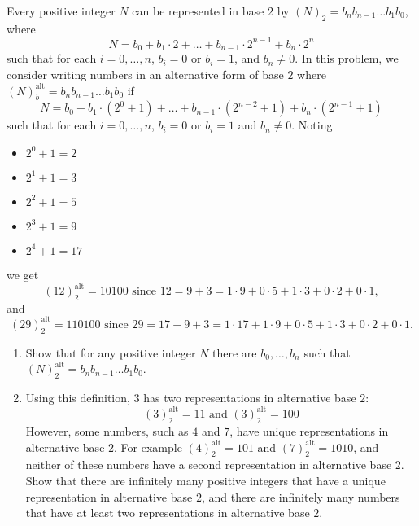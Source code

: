 Every positive integer $N$ can be represented in base $2$ by 
$(N)_{2} = b_{n}b_{n-1}\ldots b_{1}b_{0}$, where 
$$N = b_{0} + b_{1} \cdot 2 + \ldots + b_{n-1}  \cdot 2^{n-1} + b_{n}  \cdot 2^{n}$$
such that for each $i=0,\ldots,n$, $b_{i}=0$ or $b_{i}=1$, and $b_{n}\ne0$. In this problem, we consider writing numbers in an alternative form of base $2$ where $(N)^{\text{alt}}_{b}=b_{n}b_{n-1}\ldots b_{1}b_{0}$ if
$$N = b_{0} + b_{1} \cdot (2^{0} + 1) + \ldots + b_{n-1} \cdot (2^{n-2}+1) + b_{n} \cdot (2^{n-1}+1)$$
such that for each $i=0,\ldots,n$, $b_{i}=0$ or $b_{i}=1$ and $b_{n}\ne0$. Noting
\begin{itemize}
\item $2^{0} + 1 = 2$
\item $2^{1} + 1 = 3$
\item $2^{2} + 1 = 5$
\item $2^{3} + 1 = 9$
\item $2^{4} + 1 = 17$
\end{itemize}
we get
$$ (12)^{\text{alt}}_{2} = 10100 \text{ since } 12 = 9 + 3 = 1 \cdot 9 + 0 \cdot 5 + 1 \cdot 3 + 0 \cdot 2 + 0 \cdot 1,$$ 
and
$$(29)^{\text{alt}}_{2} = 110100 \text{ since } 29 = 17 + 9 + 3 = 1 \cdot 17 + 1 \cdot 9 + 0 \cdot 5 + 1 \cdot 3 + 0 \cdot 2 + 0 \cdot 1.$$

\begin{enumerate}
\item Show that for any positive integer $N$ there are $b_{0},\ldots,b_{n}$ such that $(N)^{\text{alt}}_{2} = b_{n}b_{n-1}\ldots b_{1}b_{0}$.
\item Using this definition, $3$ has two representations in alternative base $2$:
$$ (3)^{\text{alt}}_{2} = 11 \text{ and } (3)^{\text{alt}}_{2} = 100$$
However, some numbers, such as $4$ and $7$, have unique representations in alternative base $2$. For example $(4)^{\text{alt}}_{2}=101$ and $(7)^{\text{alt}}_{2}=1010$, and neither of these numbers have a second representation in alternative base $2$. Show that there are infinitely many positive integers that have a unique representation in alternative base $2$, and there are infinitely many numbers that have at least two representations in alternative base $2$.
\end{enumerate}